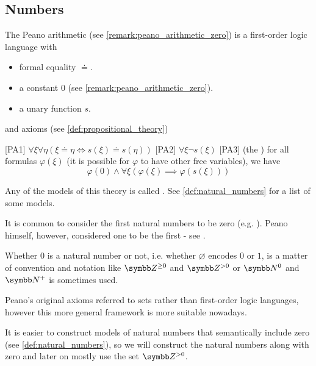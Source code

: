 \subsection{Numbers}\label{subsec:numbers}

\begin{definition}\label{def:peano_arithmetic}\cite[1]{Peano1889}
  The Peano arithmetic (see \cref{remark:peano_arithmetic_zero}) is a first-order logic language with 
  \begin{itemize}
    \item formal equality \( \doteq \).
    \item a constant \( 0 \) (see \cref{remark:peano_arithmetic_zero}).
    \item a unary function \( s \).
  \end{itemize}
  and axioms (see \cref{def:propositional_theory})
  \begin{defenum}
    [PA1] \( \forall \xi \forall \eta (\xi \doteq \eta \iff s(\xi) \doteq s(\eta)) \)
    [PA2] \( \forall \xi \neg s(\xi) \)
    [PA3] (the ) for all formulas \( \varphi(\xi) \) (it is possible for \( \varphi \) to have other free variables), we have
    \begin{equation*}
      \varphi(0) \land \forall \xi (\varphi(\xi) \implies \varphi(s(\xi)))
    \end{equation*}
  \end{defenum}

  Any of the models of this theory is called . See \cref{def:natural_numbers} for a list of some models.
\end{definition}

\begin{remark}\label{remark:peano_arithmetic_zero}
  It is common to consider the first natural numbers to be zero (e.g. \cite[67]{Enderton1977}). Peano himself, however, considered one to be the first - see \cite[1]{Peano1889}.

  Whether \( 0 \) is a natural number or not, i.e. whether \( \varnothing \) encodes \( 0 \) or \( 1 \), is a matter of convention and notation like \( \Z^{\geq 0} \) and \( \Z^{>0} \) or \( \BB{N}^0 \) and \( \BB{N}^+ \) is sometimes used.

  Peano's original axioms referred to sets rather than first-order logic languages, however this more general framework is more suitable nowadays.

  It is easier to construct models of natural numbers that semantically include zero (see \cref{def:natural_numbers}), so we will construct the natural numbers along with zero and later on mostly use the set \( \Z^{>0} \).
\end{remark}

